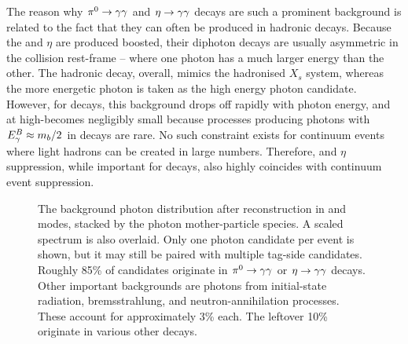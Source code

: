 The reason why $\pi^0\rightarrow\gamma\gamma$ and $\eta\rightarrow\gamma\gamma$ decays are such a prominent background is related to the fact that they can often be produced in hadronic decays.
Because the \piz and $\eta$ are produced boosted, their diphoton decays are usually asymmetric in the \epem collision rest-frame -- where one photon has a much larger energy than the other.
The hadronic decay, overall, mimics the hadronised $X_s$ system, whereas the more energetic photon is taken as the high energy photon candidate.
However, for \B decays, this background drops off rapidly with photon energy, and at high-\EB becomes negligibly small because processes producing photons with ${E^B_{\gamma}}\approx m_b/2$ in \B decays are rare.
No such constraint exists for continuum events where light hadrons can be created in large numbers.
Therefore, \piz and $\eta$ suppression, while important for \B decays, also highly coincides with continuum event suppression.

\begin{figure}[htbp!]
    \centering
    \caption{\label{fig:photon_sources} The background photon distribution after reconstruction in \feiBp and \feiBz modes, stacked by the photon mother-particle species.
    A scaled \BtoXsgamma spectrum is also overlaid.
    Only one photon candidate per event is shown, but it may still be paired with multiple tag-side candidates.
    Roughly 85\% of candidates originate in $\pi^0\rightarrow\gamma\gamma$ or $\eta\rightarrow\gamma\gamma$ decays.
    Other important backgrounds are photons from initial-state radiation, bremsstrahlung, and neutron-annihilation processes.
    These account for approximately 3\% each.
    The leftover 10\% originate in various other decays.}
\end{figure}

